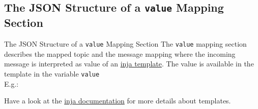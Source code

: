 ﻿\subsection{The JSON Structure of a \texttt{value} Mapping Section}

\begin{frame}[fragile]{The JSON Structure of a \texttt{value} Mapping Section}
  The \textcolor{fh-ooe-red}{\texttt{value}} mapping section describes the \textcolor{fh-ooe-red}{mapped topic} and the \textcolor{fh-ooe-red}{message mapping} where the \textcolor{fh-ooe-red}{incoming message} is \textcolor{fh-ooe-red}{interpreted as value} of an \textcolor{fh-ooe-red}{\href{https://github.com/pantor/inja/tree/master}{inja template}}. The \textcolor{fh-ooe-red}{value} is available in the template in the variable \texttt{\textcolor{fh-ooe-red}{value}}\\E.g.:

  Have a look at the \textcolor{fh-ooe-red}{\href{https://github.com/pantor/inja/tree/master}{inja documentation}} for more details about templates.
\end{frame}

